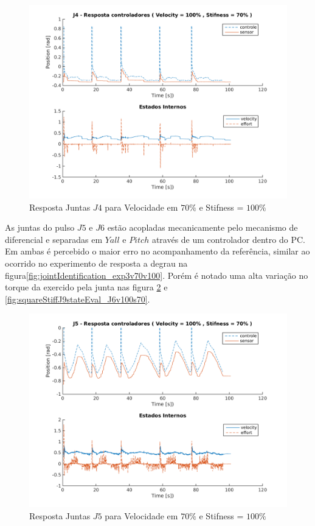 \vspace{1cm}

\begin{figure}[H]
    \centering
    \includegraphics[width=0.6\linewidth,trim={2cm 1cm 2cm 2cm}]{tex/figs/squareStiffJ9stateEval_J4v100s70.png}
    \caption{Resposta Juntas $J4$ para Velocidade em $70\%$ e Stifness = $100\%$ }
    \label{fig:squareStiffJ9stateEval_J4v100s70}
\end{figure}

As juntas do pulso $J5$ e $J6$ estão acopladas mecanicamente pelo mecanismo de diferencial e separadas em $Yall$ e $Pitch$ através de um controlador dentro do PC. Em ambas é percebido o maior erro no acompanhamento da referência, similar ao ocorrido no experimento de resposta a degrau na figura\ref{fig:jointIdentification_exp3v70v100}. Porém é notado uma alta variação no torque da exercido pela junta nas figura \ref{fig:squareStiffJ9stateEval_J5v100s70} e \ref{fig:squareStiffJ9stateEval_J6v100s70}.

\vspace{1cm}

\begin{figure}[H]
    \centering
    \includegraphics[width=0.6\linewidth,trim={2cm 1cm 2cm 2cm}]{tex/figs/squareStiffJ9stateEval_J5v100s70.png}
    \caption{Resposta Juntas $J5$ para Velocidade em $70\%$ e Stifness = $100\%$ }
    \label{fig:squareStiffJ9stateEval_J5v100s70}
\end{figure}

